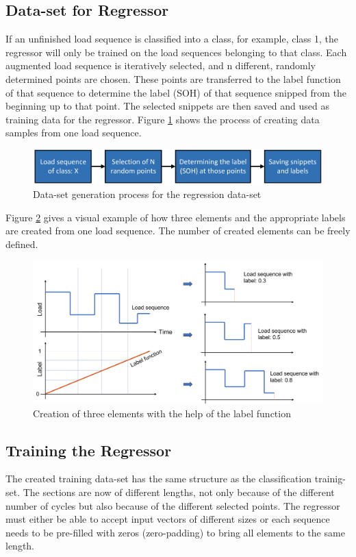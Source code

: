 \subsection{Data-set for Regressor}\label{PrRe}
If an unfinished load sequence is classified into a class, for example, class 1, the regressor will only be trained on the load sequences belonging to that class. Each augmented load sequence is iteratively selected, and n different, randomly determined points are chosen. These points are transferred to the label function of that sequence to determine the label (SOH) of that sequence snipped from the beginning up to that point. The selected snippets are then saved and used as training data for the regressor. 
Figure \ref{fig:dataregressor} shows the process of creating data samples from one load sequence.

\begin{figure}[H]
	\centering
	\includegraphics[width=0.85\linewidth]{IMGs/dataregressor.png}
	\caption{Data-set generation process for the regression data-set}
	\label{fig:dataregressor}
\end{figure}

Figure \ref{fig:4elems} gives a visual example of how three elements and the appropriate labels are created from one load sequence. The number of created elements can be freely defined.

\begin{figure}[H]
	\centering
	\includegraphics[width=0.95\linewidth]{IMGs/4elems.png}
	\caption{Creation of three elements with the help of the label function}
	\label{fig:4elems}
\end{figure}
\subsection{Training the Regressor}
The created training data-set has the same structure as the classification trainig-set. The sections are now of different lengths, not only because of the different number of cycles but also because of the different selected points. The regressor must either be able to accept input vectors of different sizes or each sequence needs to be pre-filled with zeros (zero-padding) to bring all elements to the same length.
